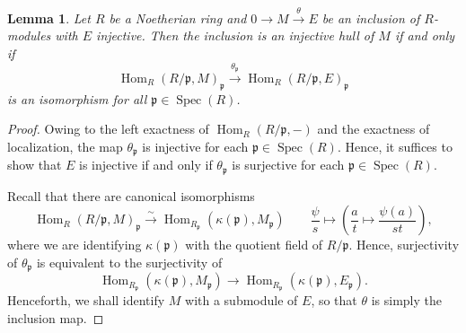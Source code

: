 \documentclass[10pt]{article}
\theoremstyle{thmstyle}
\newtheorem{lemma}[theorem]{Lemma}
\theoremstyle{defstyle}
\newcommand{\Spec}{\operatorname{Spec}}
\newcommand{\Hom}{\operatorname{Hom}}
\newcommand{\frakp}{\mathfrak{p}} %
\begin{document}
\begin{lemma}
    Let $R$ be a Noetherian ring and $0\to M\xrightarrow{\theta} E$ be an inclusion of $R$-modules with $E$ injective. Then the inclusion is an injective hull of $M$ if and only if 
    \begin{equation*}
        \Hom_R\left(R/\frakp, M\right)_\frakp\xrightarrow{\theta_\frakp}\Hom_R\left(R/\frakp, E\right)_\frakp
    \end{equation*}
    is an isomorphism for all $\frakp\in\Spec(R)$.
\end{lemma}
\begin{proof}
    Owing to the left exactness of $\Hom_R(R/\frakp, -)$ and the exactness of localization, the map $\theta_\frakp$ is injective for each $\frakp\in\Spec(R)$. Hence, it suffices to show that $E$ is injective if and only if $\theta_\frakp$ is surjective for each $\frakp\in\Spec (R)$. 

    Recall that there are canonical isomorphisms 
    \begin{equation*}
        \Hom_R(R/\frakp, M)_\frakp\xrightarrow{\sim}\Hom_{R_\frakp}(\kappa(\frakp), M_\frakp)\qquad\frac{\psi}{s}\longmapsto\left(\frac{a}{t}\mapsto \frac{\psi(a)}{st}\right),
    \end{equation*}
    where we are identifying $\kappa(\frakp)$ with the quotient field of $R/\frakp$. Hence, surjectivity of $\theta_\frakp$ is equivalent to the surjectivity of 
    \begin{equation*}
        \Hom_{R_\frakp}(\kappa(\frakp), M_\frakp)\to\Hom_{R_\frakp}(\kappa(\frakp), E_\frakp).
    \end{equation*}
    Henceforth, we shall identify $M$ with a submodule of $E$, so that $\theta$ is simply the inclusion map.


\end{proof}
\end{document}
